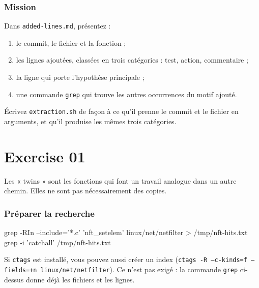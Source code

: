 \documentclass{training}
\begin{document}
\subsection*{Mission}

Dans \texttt{added-lines.md}, présentez :

\begin{enumerate}
  \item le commit, le fichier et la fonction ;
  \item les lignes ajoutées, classées en trois catégories : test, action,
        commentaire ;
  \item la ligne qui porte l'hypothèse principale ;
  \item une commande \texttt{grep} qui trouve les autres occurrences du
        motif ajouté.
\end{enumerate}

Écrivez \texttt{extraction.sh} de façon à ce qu'il prenne le commit et le
fichier en arguments, et qu'il produise les mêmes trois catégories.


\chapter{Exercise 01}
\makeheaderfiles

Les « twins » sont les fonctions qui font un travail analogue dans un autre
chemin. Elles ne sont pas nécessairement des copies.

\subsection*{Préparer la recherche}

\begin{console}
grep -RIn --include='*.c' 'nft_setelem' linux/net/netfilter > /tmp/nft-hits.txt
grep -i 'catchall' /tmp/nft-hits.txt
\end{console}

Si \texttt{ctags} est installé, vous pouvez aussi créer un index
(\texttt{ctags -R --c-kinds=f --fields=+n linux/net/netfilter}). Ce n'est
pas exigé : la commande \texttt{grep} ci-dessus donne déjà les fichiers et
les lignes.
\end{document}
